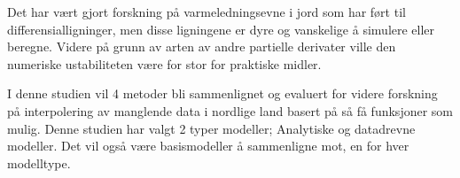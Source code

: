 Det har vært gjort forskning på varmeledningsevne i jord som har ført til differensialligninger\cite{karvonen_model_1988}, men disse ligningene\cite{fourier_analytical_2009,karvonen_model_1988} er dyre og vanskelige å simulere eller beregne\cite{rankinen_simple_2004}. Videre på grunn av arten av andre partielle derivater ville den numeriske ustabiliteten være for stor for praktiske midler.

I denne studien vil 4 metoder bli sammenlignet og evaluert for videre forskning på interpolering av manglende data i nordlige land basert på så få funksjoner som mulig. Denne studien har valgt 2 typer modeller; Analytiske og datadrevne modeller. Det vil også være basismodeller å sammenligne mot, en for hver modelltype.